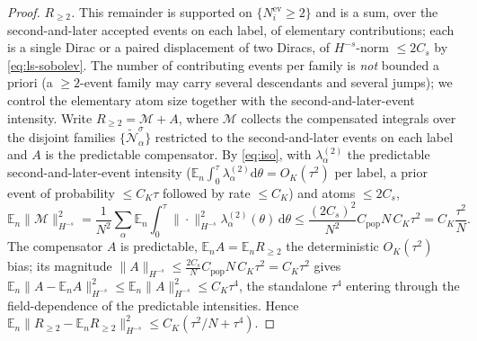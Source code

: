 \documentclass[a4paper,fleqn]{cas-sc}
\theoremstyle{definition}
\theoremstyle{remark}
\begin{document}
\begin{proof}
\emph{$R_{\ge2}$.} This remainder is supported on $\{N^{\mathrm{ev}}_i\ge2\}$ and is a sum,
over the second-and-later accepted events on each label, of elementary contributions; each
is a single Dirac or a paired displacement of two Diracs, of $H^{-s}$-norm $\le2C_s$ by
\eqref{eq:ls-sobolev}. The number of contributing events per family is \emph{not} bounded a
priori (a $\ge2$-event family may carry several descendants and several jumps); we control
the elementary atom size together with the second-and-later-event intensity. Write
$R_{\ge2}=\mathcal M+A$, where $\mathcal M$ collects the compensated integrals over the
disjoint families $\{\widetilde{\mathcal N}^\sigma_\alpha\}$ restricted to the
second-and-later events on each label and $A$ is the predictable compensator. By
\eqref{eq:iso}, with $\lambda^{(2)}_\alpha$ the predictable second-and-later-event
intensity ($\mathbb E_n\int_0^\tau\lambda^{(2)}_\alpha\mathrm d\theta=O_K(\tau^2)$ per label,
a prior event of probability $\le C_K\tau$ followed by rate $\le C_K$) and atoms $\le2C_s$,
\[
\mathbb E_n\|\mathcal M\|_{H^{-s}}^2
=\frac1{N^2}\sum_\alpha\mathbb E_n\!\int_0^\tau\!\|\cdot\|_{H^{-s}}^2\lambda^{(2)}_\alpha(\theta)\,\mathrm d\theta
\le\frac{(2C_s)^2}{N^2}C_{\mathrm{pop}}N\,C_K\tau^2=C_K\frac{\tau^2}{N}.
\]
The compensator $A$ is predictable, $\mathbb E_nA=\mathbb E_nR_{\ge2}$ the deterministic
$O_K(\tau^2)$ bias; its magnitude $\|A\|_{H^{-s}}\le\frac{2C_s}{N}C_{\mathrm{pop}}N\,C_K\tau^2=C_K\tau^2$
gives $\mathbb E_n\|A-\mathbb E_nA\|_{H^{-s}}^2\le\mathbb E_n\|A\|_{H^{-s}}^2\le C_K\tau^4$, the
standalone $\tau^4$ entering through the field-dependence of the predictable intensities.
Hence $\mathbb E_n\|R_{\ge2}-\mathbb E_nR_{\ge2}\|_{H^{-s}}^2\le C_K(\tau^2/N+\tau^4)$.


\end{proof}
\end{document}
